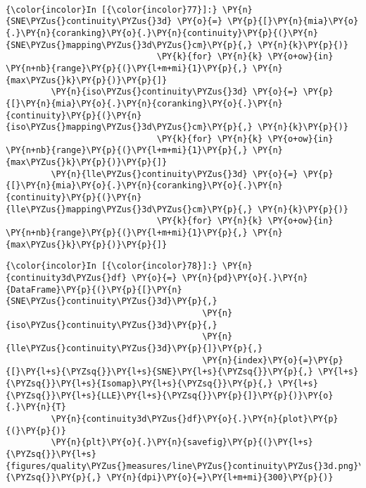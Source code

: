     \begin{center}
    \end{center}
    { \hspace*{\fill} \\}

    \begin{Verbatim}[commandchars=\\\{\}]
{\color{incolor}In [{\color{incolor}77}]:} \PY{n}{SNE\PYZus{}continuity\PYZus{}3d} \PY{o}{=} \PY{p}{[}\PY{n}{mia}\PY{o}{.}\PY{n}{coranking}\PY{o}{.}\PY{n}{continuity}\PY{p}{(}\PY{n}{SNE\PYZus{}mapping\PYZus{}3d\PYZus{}cm}\PY{p}{,} \PY{n}{k}\PY{p}{)}
                              \PY{k}{for} \PY{n}{k} \PY{o+ow}{in} \PY{n+nb}{range}\PY{p}{(}\PY{l+m+mi}{1}\PY{p}{,} \PY{n}{max\PYZus{}k}\PY{p}{)}\PY{p}{]}
         \PY{n}{iso\PYZus{}continuity\PYZus{}3d} \PY{o}{=} \PY{p}{[}\PY{n}{mia}\PY{o}{.}\PY{n}{coranking}\PY{o}{.}\PY{n}{continuity}\PY{p}{(}\PY{n}{iso\PYZus{}mapping\PYZus{}3d\PYZus{}cm}\PY{p}{,} \PY{n}{k}\PY{p}{)}
                              \PY{k}{for} \PY{n}{k} \PY{o+ow}{in} \PY{n+nb}{range}\PY{p}{(}\PY{l+m+mi}{1}\PY{p}{,} \PY{n}{max\PYZus{}k}\PY{p}{)}\PY{p}{]}
         \PY{n}{lle\PYZus{}continuity\PYZus{}3d} \PY{o}{=} \PY{p}{[}\PY{n}{mia}\PY{o}{.}\PY{n}{coranking}\PY{o}{.}\PY{n}{continuity}\PY{p}{(}\PY{n}{lle\PYZus{}mapping\PYZus{}3d\PYZus{}cm}\PY{p}{,} \PY{n}{k}\PY{p}{)}
                              \PY{k}{for} \PY{n}{k} \PY{o+ow}{in} \PY{n+nb}{range}\PY{p}{(}\PY{l+m+mi}{1}\PY{p}{,} \PY{n}{max\PYZus{}k}\PY{p}{)}\PY{p}{]}
\end{Verbatim}

    \begin{Verbatim}[commandchars=\\\{\}]
{\color{incolor}In [{\color{incolor}78}]:} \PY{n}{continuity3d\PYZus{}df} \PY{o}{=} \PY{n}{pd}\PY{o}{.}\PY{n}{DataFrame}\PY{p}{(}\PY{p}{[}\PY{n}{SNE\PYZus{}continuity\PYZus{}3d}\PY{p}{,}
                                       \PY{n}{iso\PYZus{}continuity\PYZus{}3d}\PY{p}{,}
                                       \PY{n}{lle\PYZus{}continuity\PYZus{}3d}\PY{p}{]}\PY{p}{,}
                                       \PY{n}{index}\PY{o}{=}\PY{p}{[}\PY{l+s}{\PYZsq{}}\PY{l+s}{SNE}\PY{l+s}{\PYZsq{}}\PY{p}{,} \PY{l+s}{\PYZsq{}}\PY{l+s}{Isomap}\PY{l+s}{\PYZsq{}}\PY{p}{,} \PY{l+s}{\PYZsq{}}\PY{l+s}{LLE}\PY{l+s}{\PYZsq{}}\PY{p}{]}\PY{p}{)}\PY{o}{.}\PY{n}{T}
         \PY{n}{continuity3d\PYZus{}df}\PY{o}{.}\PY{n}{plot}\PY{p}{(}\PY{p}{)}
         \PY{n}{plt}\PY{o}{.}\PY{n}{savefig}\PY{p}{(}\PY{l+s}{\PYZsq{}}\PY{l+s}{figures/quality\PYZus{}measures/line\PYZus{}continuity\PYZus{}3d.png}\PY{l+s}{\PYZsq{}}\PY{p}{,} \PY{n}{dpi}\PY{o}{=}\PY{l+m+mi}{300}\PY{p}{)}
\end{Verbatim}

